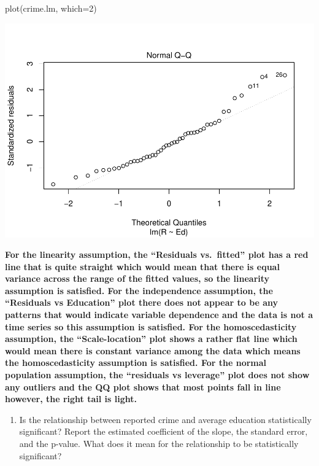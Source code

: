 \documentclass[
]{article}
\newenvironment{Shaded}{\begin{snugshade}}{\end{snugshade}}
\newcommand{\AttributeTok}[1]{\textcolor[rgb]{0.77,0.63,0.00}{#1}}
\newcommand{\DecValTok}[1]{\textcolor[rgb]{0.00,0.00,0.81}{#1}}
\newcommand{\FunctionTok}[1]{\textcolor[rgb]{0.00,0.00,0.00}{#1}}
\newcommand{\NormalTok}[1]{#1}
\providecommand{\tightlist}{%
  \setlength{\itemsep}{0pt}\setlength{\parskip}{0pt}}
\begin{document}
\begin{Shaded}
\begin{Highlighting}[]
\FunctionTok{plot}\NormalTok{(crime.lm, }\AttributeTok{which=}\DecValTok{2}\NormalTok{)}
\end{Highlighting}
\end{Shaded}

\includegraphics{Assignments_files/figure-latex/unnamed-chunk-33-6.pdf}

\textbf{For the linearity assumption, the ``Residuals vs.~fitted'' plot
has a red line that is quite straight which would mean that there is
equal variance across the range of the fitted values, so the linearity
assumption is satisfied. For the independence assumption, the
``Residuals vs Education'' plot there does not appear to be any patterns
that would indicate variable dependence and the data is not a time
series so this assumption is satisfied. For the homoscedasticity
assumption, the ``Scale-location'' plot shows a rather flat line which
would mean there is constant variance among the data which means the
homoscedasticity assumption is satisfied. For the normal population
assumption, the ``residuals vs leverage'' plot does not show any
outliers and the QQ plot shows that most points fall in line however,
the right tail is light. }

\begin{enumerate}
\def\labelenumi{\arabic{enumi}.}
\setcounter{enumi}{4}
\tightlist
\item
  Is the relationship between reported crime and average education
  statistically significant? Report the estimated coefficient of the
  slope, the standard error, and the p-value. What does it mean for the
  relationship to be statistically significant?
\end{enumerate}
\end{document}
